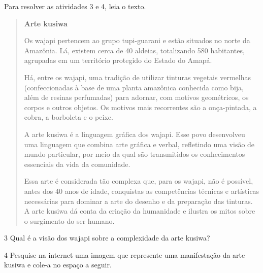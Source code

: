 Para resolver as atividades 3 e 4, leia o texto.

\begin{quote}
\textbf{Arte kusiwa}

Os wajapi pertencem ao grupo tupi-guarani e estão situados no norte da
Amazônia. Lá, existem cerca de 40 aldeias, totalizando 580 habitantes,
agrupadas em um território protegido do Estado do Amapá.

Há, entre os wajapi, uma tradição de utilizar tinturas vegetais vermelhas
(confeccionadas à base de uma planta amazônica conhecida como bija, além
de resinas perfumadas) para adornar, com motivos geométricos, os corpos e
outros objetos. Os motivos mais recorrentes são a onça-pintada, a cobra, a
borboleta e o peixe.

A arte kusiwa é a linguagem gráfica dos wajapi. Esse povo
desenvolveu uma linguagem que combina arte gráfica e verbal, refletindo uma
visão de mundo particular, por meio da qual são transmitidos os conhecimentos
essenciais da vida da comunidade.

Essa arte é considerada tão complexa que, para os wajapi, não é possível, antes
dos 40 anos de idade, conquistas as competências técnicas e artísticas necessárias
para dominar a arte do desenho e da preparação das tinturas. A arte kusiwa dá conta
da criação da humanidade e ilustra os mitos sobre o surgimento do ser humano.

\end{quote}


\num{3}  Qual é a visão dos wajapi sobre a complexidade da arte kusiwa?


\pagebreak
\num{4}  Pesquise na internet uma imagem que represente uma manifestação da
arte kusiwa e cole-a no espaço a seguir.

\begin{mdframed}[linewidth=2pt,linecolor=salmao,roundcorner=20pt]
\vspace{19cm}
\end{mdframed}



